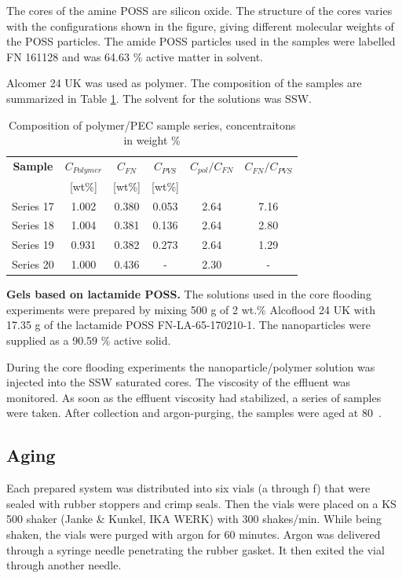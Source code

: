 \documentclass[journal = enfuem, manuscript =  article]{achemso}
\begin{document}
The cores of the amine POSS are silicon oxide. The structure of the cores varies with the configurations shown in the figure, giving different molecular weights of the POSS particles. The amide POSS particles used in the samples were labelled FN 161128 and was 64.63 \% active matter in solvent.

Alcomer 24 UK was used as polymer. The composition of the samples are summarized in Table \ref{tab:polyPecComp}. The solvent for the solutions was SSW.

\begin{table} 

\centering
\caption{Composition of polymer/PEC sample series, concentraitons in weight \%}
\label{tab:polyPecComp}
\begin{tabular}{c c c c c c } 
\toprule
\textbf{Sample} & \textbf{$C_{Polymer}$} & \textbf{$C_{FN}$} & \textbf{$C_{PVS}$} & \textbf{$C_{pol}/C_{FN}$} & \textbf{$C_{FN}/C_{PVS}$} \\ 
&[wt\%]& [wt\%] & [wt\%] && \\
\midrule 
Series 17   & 1.002   & 0.380 & 0.053 & 2.64 & 7.16\\
Series 18   & 1.004   & 0.381 & 0.136 & 2.64 & 2.80\\ 
Series 19   & 0.931   & 0.382 & 0.273 & 2.64 & 1.29\\ 
Series 20   & 1.000   & 0.436 & - & 2.30     & - \\
\bottomrule
\end{tabular}
\end{table}

\textbf{Gels based on lactamide POSS.}
The solutions used in the core flooding experiments were prepared by mixing 500 g of 2 wt.\% Alcoflood 24 UK with 17.35 g of the lactamide POSS FN-LA-65-170210-1. The nanoparticles were supplied as a 90.59 \% active solid.

During the core flooding experiments the nanoparticle/polymer solution was injected into the SSW saturated cores. The viscosity of the effluent was monitored. As soon as the effluent viscosity had stabilized, a series of samples were taken. After collection and argon-purging, the samples were aged at 80~\celsius. 


\subsection{Aging}
Each prepared system was distributed into six vials (a through f) that were sealed with rubber stoppers and crimp seals. Then the vials were placed on a KS 500 shaker (Janke \& Kunkel, IKA WERK) with 300 shakes/min. While being shaken, the vials were purged with argon for 60 minutes. Argon was delivered through a syringe needle penetrating the rubber gasket. It then exited the vial through another needle.
\end{document}
